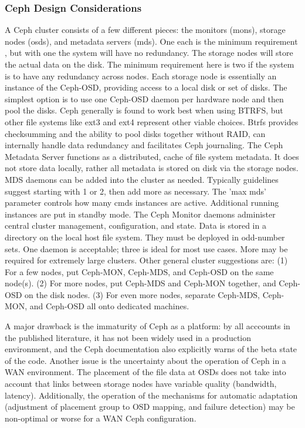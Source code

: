 \documentclass[11pt]{article}
\begin{document}
\subsubsection{Ceph Design Considerations}
A Ceph cluster consists of a few different pieces: the monitors (mons), 
storage nodes (osds), and metadata servers (mds). One each is the minimum 
requirement , but with one the system will have no  redundancy.
The storage nodes will store the actual data on the disk. The minimum 
requirement here is two if the system is to have any redundancy across 
nodes. Each storage node is essentially an instance of the Ceph-OSD, 
providing access to a local disk or set of disks. The simplest option is 
to use one Ceph-OSD daemon per hardware node and then pool the disks. 
Ceph generally is found to work best when using BTRFS, but other file 
systems like ext3 and ext4 represent other viable choices. Btrfs provides 
checksumming and the ability to pool disks together without RAID, can 
internally handle data redundancy and facilitates Ceph journaling. 
The Ceph Metadata Server functions as a distributed, cache of file system 
metadata. It does not store data locally, rather all metadata is stored on 
disk via the storage nodes. MDS daemons can be added into the cluster as 
needed. Typically guidelines suggest starting with 1 or 2, then add more 
as necessary.  The 'max mds' parameter controls how many cmds instances 
are active. Additional running instances are put in standby mode. The 
Ceph Monitor daemons administer central cluster management, configuration, 
and state. Data is stored in a directory on the local host file system. 
They must be deployed in odd-number sets. One daemon is acceptable; three 
is ideal for most use cases. More may be required for extremely large 
clusters. Other general cluster suggestions are: (1) For a few nodes,  
put Ceph-MON, Ceph-MDS, and Ceph-OSD on the same node(s). (2) For more 
nodes,  put Ceph-MDS and Ceph-MON together, and Ceph-OSD on the disk nodes. 
(3) For even more nodes, separate Ceph-MDS, Ceph-MON, and Ceph-OSD all 
onto dedicated machines.

A major drawback is the immaturity of Ceph as a platform: by all acccounts 
in the published literature, it has not been widely used in a production 
environment, and the Ceph documentation also explicitly warns of the beta 
state of the code. Another issue is the uncertainty about the operation 
of Ceph in a WAN environment. The placement of the file data at OSDs does 
not take into account that links between storage nodes have variable 
quality (bandwidth, latency). Additionally, the operation of the mechanisms 
for automatic adaptation (adjustment of placement group to OSD mapping, 
and failure detection) may be non-optimal or worse for a WAN Ceph 
configuration.
\end{document}
